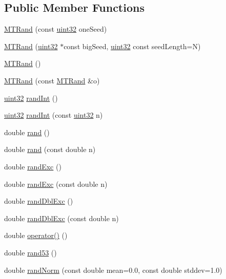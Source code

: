 \begin{CompactItemize}
\subsection*{Public Member Functions}
\begin{CompactItemize}
\item 
\hyperlink{classMTRand_172bc7e7cf1e578ef3f9c90a8cee3eb1}{MTRand} (const \hyperlink{classMTRand_45478edf9e24dcd2a5164bac3889d6a2}{uint32} oneSeed)
\item 
\hyperlink{classMTRand_380e79e0192b46426abcefa6e2dd082e}{MTRand} (\hyperlink{classMTRand_45478edf9e24dcd2a5164bac3889d6a2}{uint32} $\ast$const bigSeed, \hyperlink{classMTRand_45478edf9e24dcd2a5164bac3889d6a2}{uint32} const seedLength=N)
\item 
\hyperlink{classMTRand_265dc65546e26073c0d5f8787b045a1d}{MTRand} ()
\item 
\hyperlink{classMTRand_ff69d4a4ec88475bab03a295e8fb0f60}{MTRand} (const \hyperlink{classMTRand}{MTRand} \&o)
\item 
\hyperlink{classMTRand_45478edf9e24dcd2a5164bac3889d6a2}{uint32} \hyperlink{classMTRand_d1008efd4fe0e8aae30459c2c58cfe35}{randInt} ()
\item 
\hyperlink{classMTRand_45478edf9e24dcd2a5164bac3889d6a2}{uint32} \hyperlink{classMTRand_3515bbf6e1b46680a4ce6968451942b6}{randInt} (const \hyperlink{classMTRand_45478edf9e24dcd2a5164bac3889d6a2}{uint32} n)
\item 
double \hyperlink{classMTRand_76d129a2d850c24ff4a0613f299cf3a5}{rand} ()
\item 
double \hyperlink{classMTRand_a4fe82fc27fd81414ce7554093a9766b}{rand} (const double n)
\item 
double \hyperlink{classMTRand_fd05e468983b3a3d66ce0f403bd666af}{randExc} ()
\item 
double \hyperlink{classMTRand_a1e89d6c7ac8737567b3ccf8fe70b6de}{randExc} (const double n)
\item 
double \hyperlink{classMTRand_4d3a475aa72fe6d1a6d7d9e16d6a732e}{randDblExc} ()
\item 
double \hyperlink{classMTRand_1a81d8f00de8f553d4b8626d64e1c544}{randDblExc} (const double n)
\item 
double \hyperlink{classMTRand_bbb87a08d622d58fdee0eea4cb5471a0}{operator()} ()
\item 
double \hyperlink{classMTRand_15f4daf79febbe4ff43c3e6ce2c4fcbe}{rand53} ()
\item 
double \hyperlink{classMTRand_4c284f626b6d40a0367ff2a949ea1944}{randNorm} (const double mean=0.0, const double stddev=1.0)

\end{CompactItemize}
\end{CompactItemize}
